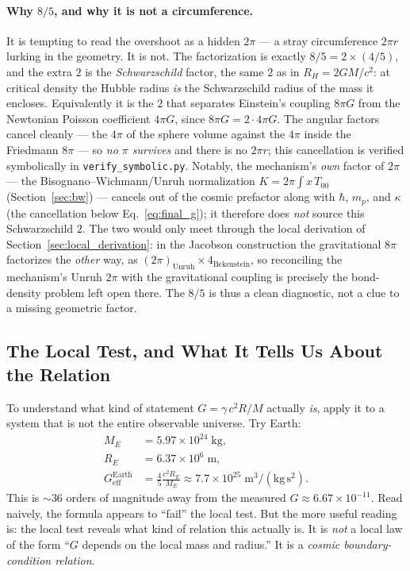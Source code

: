 \documentclass[11pt,letterpaper]{article}
\begin{document}
\paragraph{Why $8/5$, and why it is not a circumference.}
It is tempting to read the overshoot as a hidden $2\pi$ --- a stray
circumference $2\pi r$ lurking in the geometry. It is not. The factorization is
exactly $8/5 = 2 \times (4/5)$, and the extra $2$ is the \emph{Schwarzschild}
factor, the same $2$ as in $R_H = 2GM/c^2$: at critical density the Hubble
radius \emph{is} the Schwarzschild radius of the mass it encloses. Equivalently
it is the $2$ that separates Einstein's coupling $8\pi G$ from the Newtonian
Poisson coefficient $4\pi G$, since $8\pi G = 2 \cdot 4\pi G$. The angular
factors cancel cleanly --- the $4\pi$ of the sphere volume against the $4\pi$
inside the Friedmann $8\pi$ --- so \emph{no $\pi$ survives} and there is no
$2\pi r$; this cancellation is verified symbolically in
\texttt{verify\_symbolic.py}. Notably, the mechanism's \emph{own} factor of
$2\pi$ --- the Bisognano--Wichmann/Unruh normalization $K = 2\pi\int x\,T_{00}$
(Section~\ref{sec:bw}) --- cancels out of the cosmic prefactor along with
$\hbar$, $m_p$, and $\kappa$ (the cancellation below
Eq.~\eqref{eq:final_g}); it therefore does \emph{not} source this Schwarzschild
$2$. The two would only meet through the local derivation of
Section~\ref{sec:local_derivation}: in the Jacobson construction the
gravitational $8\pi$ factorizes the \emph{other} way, as
$(2\pi)_{\mathrm{Unruh}} \times 4_{\mathrm{Bekenstein}}$, so reconciling the
mechanism's Unruh $2\pi$ with the gravitational coupling is precisely the
bond-density problem left open there. The $8/5$ is thus a clean diagnostic, not
a clue to a missing geometric factor.

\subsection{The Local Test, and What It Tells Us About the Relation}
\label{sec:local_test}

To understand what kind of statement $G = \gamma\, c^2 R/M$ actually
\emph{is}, apply it to a system that is not the entire observable
universe. Try Earth:
\begin{align}
  M_E &= 5.97 \times 10^{24}\;\mathrm{kg}, \\
  R_E &= 6.37 \times 10^{6}\;\mathrm{m}, \\
  G_{\mathrm{eff}}^{\mathrm{Earth}} &= \frac{4}{5} \frac{c^2 R_E}{M_E}
    \approx 7.7 \times 10^{25}\;\mathrm{m^3/(kg\,s^2)}.
\end{align}
This is $\sim 36$ orders of magnitude away from the measured
$G \approx 6.67 \times 10^{-11}$. Read naively, the formula appears
to ``fail'' the local test. But the more useful reading is: the
local test reveals what kind of relation this actually is. It is
\emph{not} a local law of the form ``$G$ depends on the local mass
and radius.'' It is a \emph{cosmic boundary-condition relation}.
\end{document}
